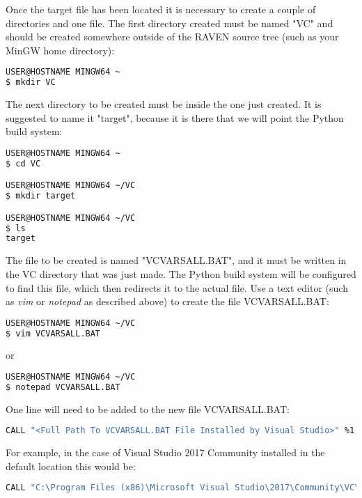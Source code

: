 \begin{enumerate}
		\medskip
		Once the target file has been located it is necessary to create a couple of directories
		and one file. The first directory created must be named "VC" and should be created
		somewhere outside of the RAVEN source tree (such as your MinGW home directory):

\begin{lstlisting}[language=bash]
USER@HOSTNAME MINGW64 ~
$ mkdir VC
\end{lstlisting}

		The next directory to be created must be inside the one just created. It is suggested
		to name it "target", because it is there that we will point the Python build system:

\begin{lstlisting}[language=bash]
USER@HOSTNAME MINGW64 ~
$ cd VC

USER@HOSTNAME MINGW64 ~/VC
$ mkdir target

USER@HOSTNAME MINGW64 ~/VC
$ ls
target

\end{lstlisting}

		The file to be created is named "VCVARSALL.BAT", and it must be written in the VC
		directory that was just made. The Python build system will be configured to find this
		file, which then redirects it to the actual file. Use a text editor (such as
		{\it vim} or {\it notepad} as described above) to create the file VCVARSALL.BAT:

\begin{lstlisting}[language=bash]
USER@HOSTNAME MINGW64 ~/VC
$ vim VCVARSALL.BAT
\end{lstlisting}

		or

\begin{lstlisting}[language=bash]
USER@HOSTNAME MINGW64 ~/VC
$ notepad VCVARSALL.BAT
\end{lstlisting}

		One line will need to be added to the new file VCVARSALL.BAT:

\begin{lstlisting}[language=bash, basicstyle=\tiny]
CALL "<Full Path To VCVARSALL.BAT File Installed by Visual Studio>" %1 %2 %3 %4 %5
\end{lstlisting}

		For example, in the case of Visual Studio 2017 Community installed in the default
		location this would be:

\begin{lstlisting}[language=bash, basicstyle=\tiny]
CALL "C:\Program Files (x86)\Microsoft Visual Studio\2017\Community\VC\Auxiliary\Build\VCVARSALL.BAT" %1 %2 %3 %4 %5
\end{lstlisting}


\end{enumerate}
